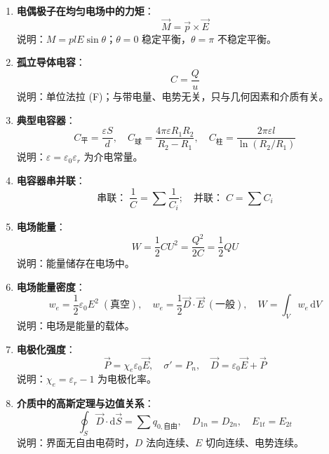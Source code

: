\documentclass[12pt,a4paper]{ctexart}
\begin{document}
\begin{enumerate}[leftmargin=3em,label=\textbf{公式\arabic*}：,ref=公式\arabic*]
    \item \textbf{电偶极子在均匀电场中的力矩}：
    \[
        \vec M=\vec p\times\vec E
    \]
    说明：$M=plE\sin\theta$；$\theta=0$ 稳定平衡，$\theta=\pi$ 不稳定平衡。

    \item \textbf{孤立导体电容}：
    \[
        C=\dfrac{Q}{u}
    \]
    说明：单位法拉 (F)；与带电量、电势无关，只与几何因素和介质有关。

    \item \textbf{典型电容器}：
    \[
        C_{\text{平}}=\dfrac{\varepsilon S}{d},\quad C_{\text{球}}=\dfrac{4\pi\varepsilon R_1 R_2}{R_2-R_1},\quad C_{\text{柱}}=\dfrac{2\pi\varepsilon l}{\ln(R_2/R_1)}
    \]
    说明：$\varepsilon=\varepsilon_0\varepsilon_r$ 为介电常量。

    \item \textbf{电容器串并联}：
    \[
        \text{串联：}\;\dfrac{1}{C}=\sum\dfrac{1}{C_i};\quad \text{并联：}\;C=\sum C_i
    \]

    \item \textbf{电场能量}：
    \[
        W=\dfrac{1}{2}CU^2=\dfrac{Q^2}{2C}=\dfrac{1}{2}QU
    \]
    说明：能量储存在电场中。

    \item \textbf{电场能量密度}：
    \[
        w_e=\dfrac{1}{2}\varepsilon_0 E^2 \;(\text{真空}),\quad w_e=\dfrac{1}{2}\vec D\cdot\vec E \;(\text{一般}),\quad W=\int_V w_e\,\mathrm dV
    \]
    说明：电场是能量的载体。

    \item \textbf{电极化强度}：
    \[
        \vec P=\chi_e\varepsilon_0\vec E,\quad \sigma'=P_n,\quad \vec D=\varepsilon_0\vec E+\vec P
    \]
    说明：$\chi_e=\varepsilon_r-1$ 为电极化率。

    \item \textbf{介质中的高斯定理与边值关系}：
    \[
        \oint_S \vec D\cdot\mathrm d\vec S=\sum q_{0,\text{自由}},\quad D_{1n}=D_{2n},\quad E_{1t}=E_{2t}
    \]
    说明：界面无自由电荷时，$D$ 法向连续、$E$ 切向连续、电势连续。

\end{enumerate}
\end{document}
